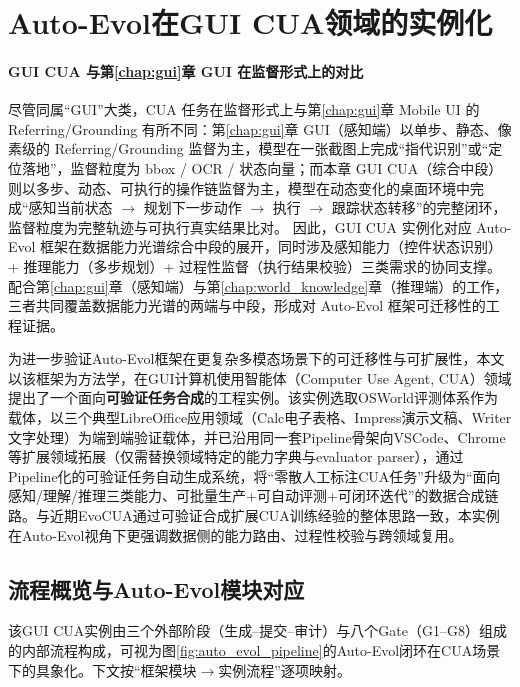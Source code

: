 \section{Auto-Evol在GUI CUA领域的实例化}
\label{sec:auto_evol_gui_cua}

\paragraph{GUI CUA 与第\ref{chap:gui}章 GUI 在监督形式上的对比}
尽管同属“GUI”大类，CUA 任务在监督形式上与第\ref{chap:gui}章 Mobile UI 的 Referring/\allowbreak Grounding 有所不同：第\ref{chap:gui}章 GUI（感知端）以单步、静态、像素级的 Referring/\allowbreak Grounding 监督为主，模型在一张截图上完成“指代识别”或“定位落地”，监督粒度为 bbox / OCR / 状态向量；而本章 GUI CUA（综合中段）则以多步、动态、可执行的操作链监督为主，模型在动态变化的桌面环境中完成“感知当前状态 $\rightarrow$ 规划下一步动作 $\rightarrow$ 执行 $\rightarrow$ 跟踪状态转移”的完整闭环，监督粒度为完整轨迹与可执行真实结果比对。
因此，GUI CUA 实例化对应 Auto-Evol 框架在数据能力光谱综合中段的展开，同时涉及感知能力（控件状态识别）+ 推理能力（多步规划）+ 过程性监督（执行结果校验）三类需求的协同支撑。配合第\ref{chap:gui}章（感知端）与第\ref{chap:world_knowledge}章（推理端）的工作，三者共同覆盖数据能力光谱的两端与中段，形成对 Auto-Evol 框架可迁移性的工程证据。

为进一步验证Auto-Evol框架在更复杂多模态场景下的可迁移性与可扩展性，本文以该框架为方法学，在GUI计算机使用智能体（Computer Use Agent, CUA）领域提出了一个面向\textbf{可验证任务合成}的工程实例。该实例选取OSWorld\citep{xie2024osworld}评测体系作为载体，以三个典型LibreOffice应用领域（Calc电子表格、Impress演示文稿、Writer文字处理）为端到端验证载体，并已沿用同一套Pipeline骨架向VSCode、Chrome等扩展领域拓展（仅需替换领域特定的能力字典与evaluator parser），通过Pipeline化的可验证任务自动生成系统，将“零散人工标注CUA任务”升级为“面向感知/理解/推理三类能力、可批量生产+可自动评测+可闭环迭代”的数据合成链路。与近期EvoCUA\citep{xue2026evocua}通过可验证合成扩展CUA训练经验的整体思路一致，本实例在Auto-Evol视角下更强调数据侧的能力路由、过程性校验与跨领域复用。

\subsection{流程概览与Auto-Evol模块对应}
该GUI CUA实例由三个外部阶段（生成--提交--审计）与八个Gate（G1--G8）组成的内部流程构成，可视为图\ref{fig:auto_evol_pipeline}的Auto-Evol闭环在CUA场景下的具象化。下文按“框架模块$\rightarrow$实例流程”逐项映射。

